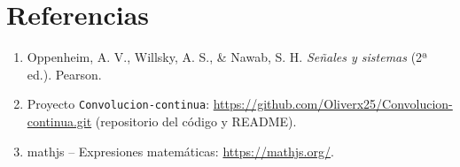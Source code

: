 \documentclass[12pt,a4paper]{article}
\begin{document}
\section*{Referencias}

\begin{enumerate}
  \item Oppenheim, A. V., Willsky, A. S., \& Nawab, S. H. \emph{Señales y sistemas} (2ª ed.). Pearson.
  \item Proyecto \texttt{Convolucion-continua}: \url{https://github.com/Oliverx25/Convolucion-continua.git} (repositorio del código y README).
  \item mathjs -- Expresiones matemáticas: \url{https://mathjs.org/}.
\end{enumerate}
\end{document}
